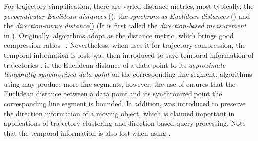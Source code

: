 %
For trajectory simplification, there are varied distance metrics, most typically, the \emph{perpendicular Euclidean distances} (\ped), the \emph{synchronous Euclidean distances}\cite{Meratnia:Spatiotemporal} (\sed) and the \emph{direction-aware distance}\cite{Zhang:Evaluation}(\dad) (It is first called the \emph{direction-based measurement} in \cite{Long:Direction}).
Originally, \lsa algorithms adopt \ped as the distance metric, which brings good compression ratios~ \cite{Douglas:Peucker, Hershberger:Speeding, Liu:BQS, Muckell:Compression, Chen:Trajectory, Cao:Spatio, Shi:Survey}. Nevertheless, when uses it for trajectory compression, the temporal information is lost.
%
\sed was then introduced to save temporal information of trajectories \cite{Meratnia:Spatiotemporal}. \sed is the Euclidean distance of a data point to its \emph{approximate temporally synchronized data point} \cite{Meratnia:Spatiotemporal} on the corresponding line segment.
\lsa algorithms using \sed may produce more line segments, however, the use of \sed ensures that the Euclidean distance between a data point and its synchronized point \wrt the corresponding line segment is bounded.
%
In addition, \dad\cite{Long:Direction, Zhang:Evaluation} was introduced to preserve the direction information of a moving object, which is claimed important in applications of trajectory clustering and direction-based query processing\cite{Long:Direction}. Note that the temporal information is also lost when using \dad.

